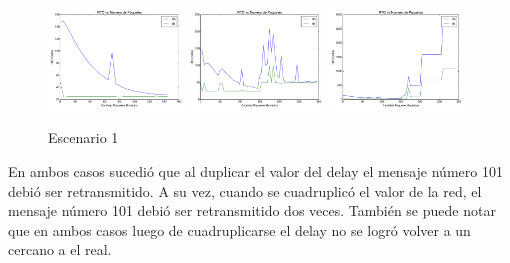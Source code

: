         \begin{figure}[H]
            \center
	        
		    \includegraphics[width=0.32\textwidth]{imagenes/guille/rtt_vs_n_8_2.pdf}
		    \includegraphics[width=0.32\textwidth]{imagenes/guille/congestion_50_8_2.pdf}
		    \includegraphics[width=0.32\textwidth]{imagenes/guille/congestion_100_8_2.pdf}

            \caption{Escenario 1}
	
        \end{figure}          

        En ambos casos sucedi\'o que al duplicar el valor del delay el 
        mensaje n\'umero 101 debi\'o ser retransmitido. A su vez, cuando 
        se cuadruplic\'o el valor de la red, el mensaje n\'umero 101 debi\'o
        ser retransmitido dos veces. 
        Tambi\'en se puede notar que en ambos casos luego de cuadruplicarse
        el delay no se logr\'o volver a un \rto{} cercano a el \rtt{} real.


